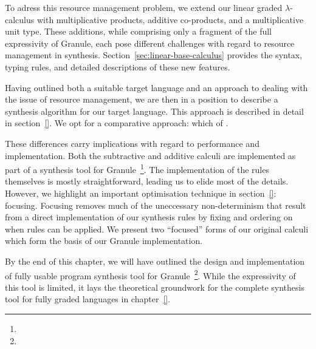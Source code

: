 To adress this resource management problem, we extend our linear graded
$\lambda$-calculus with multiplicative products, additive co-products, and a
multiplicative unit type. These additions, while comprising only a fragment of the full
expressivity of Granule, each pose different challenges with regard to resource
management in synthesis. Section~\ref{sec:linear-base-calculus} provides the
syntax, typing rules, and detailed descriptions of these new features.

Having outlined both a suitable target language and an approach to dealing with
the issue of resource management, we are then in a position to describe a
synthesis algorithm for our target language. This approach is described in
detail in section~\ref{}. We opt for a comparative approach: which of . 

These differences carry implications with regard to performance and
implementation. Both the subtractive and additive calculi are implemented as
part of a synthesis tool for Granule~\footnote{}. The implementation of the
rules themselves is mostly straightforward, leading us to elide most of the
details. However, we highlight an important optimisation technique in
section~\ref{}: focusing. Focusing removes much of the uneccessary
non-determinism that result from a direct implementation of our synthesis rules
by fixing and ordering on when rules can be applied. We present two ``focused''
forms of our original calculi which form the basis of our Granule
implementation.

By the end of this chapter, we will have outlined the design and implementation
of fully usable program synthesis tool for Granule~\footnote{}. While the
expressivity of this tool is limited, it lays the theoretical groundwork for the
complete synthesis tool for fully graded languages in chapter~\ref{}. 
